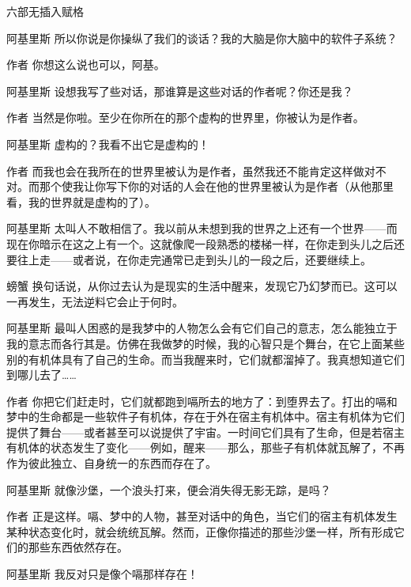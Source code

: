 \begin{dialog}{六部无插入赋格}
\begin{dialogue}
\item[阿基里斯]所以你说是你操纵了我们的谈话？我的大脑是你大脑中的软件子系统？

\item[作者]你想这么说也可以，阿基。

\item[阿基里斯]设想我写了些对话，那谁算是这些对话的作者呢？你还是我？

\item[作者]当然是你啦。至少在你所在的那个虚构的世界里，你被认为是作者。

\item[阿基里斯]虚构的？我看不出它是虚构的！

\item[作者]而我也会在我所在的世界里被认为是作者，虽然我还不能肯定这样做对不对。而那个使我让你写下你的对话的人会在他的世界里被认为是作者（从他那里看，我的世界就是虚构的了）。

\item[阿基里斯]太叫人不敢相信了。我以前从未想到我的世界之上还有一个世界——而现在你暗示在这之上有一个。这就像爬一段熟悉的楼梯一样，在你走到头儿之后还要往上走——或者说，在你走完通常已走到头儿的一段之后，还要继续上。

\item[螃蟹]换句话说，从你过去认为是现实的生活中醒来，发现它乃幻梦而已。这可以一再发生，无法逆料它会止于何时。

\item[阿基里斯]最叫人困惑的是我梦中的人物怎么会有它们自己的意志，怎么能独立于我的意志而各行其是。仿佛在我做梦的时候，我的心智只是个舞台，在它上面某些别的有机体具有了自己的生命。而当我醒来时，它们就都溜掉了。我真想知道它们到哪儿去了……

\item[作者]你把它们赶走时，它们就都跑到嗝所去的地方了：到堕界去了。打出的嗝和梦中的生命都是一些软件子有机体，存在于外在宿主有机体中。宿主有机体为它们提供了舞台——或者甚至可以说提供了宇宙。一时间它们具有了生命，但是若宿主有机体的状态发生了变化——例如，醒来——那么，那些子有机体就瓦解了，不再作为彼此独立、自身统一的东西而存在了。

\item[阿基里斯]就像沙堡，一个浪头打来，便会消失得无影无踪，是吗？

\item[作者]正是这样。嗝、梦中的人物，甚至对话中的角色，当它们的宿主有机体发生某种状态变化时，就会统统瓦解。然而，正像你描述的那些沙堡一样，所有形成它们的那些东西依然存在。

\item[阿基里斯]我反对只是像个嗝那样存在！


\end{dialogue}
\end{dialog}
